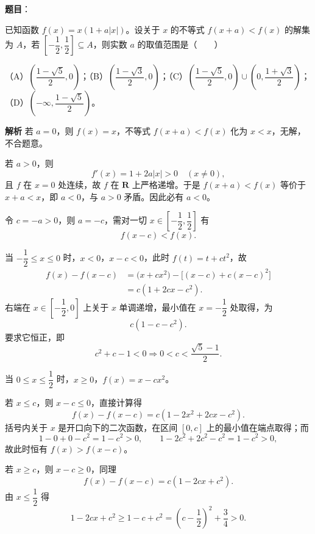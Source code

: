 \begin{answer}

\textbf{题目}：

已知函数 $f(x)=x(1+a|x|)$。设关于 $x$ 的不等式 $f(x+a)<f(x)$ 的解集为 $A$，若 $\left[-\dfrac12,\dfrac12\right]\subseteq A$，则实数 $a$ 的取值范围是\mbox{（　　）}

（A）$\left(\dfrac{1-\sqrt5}{2},0\right)$；（B）$\left(\dfrac{1-\sqrt3}{2},0\right)$；（C）$\left(\dfrac{1-\sqrt5}{2},0\right)\cup\left(0,\dfrac{1+\sqrt3}{2}\right)$；（D）$\left(-\infty,\dfrac{1-\sqrt5}{2}\right)$。

\textbf{解析}
若 $a=0$，则 $f(x)=x$，不等式 $f(x+a)<f(x)$ 化为 $x<x$，无解，不合题意。

若 $a>0$，则
\nopagebreak[4]
\[f'(x)=1+2a|x|>0\quad(x\neq0),\]
且 $f$ 在 $x=0$ 处连续，故 $f$ 在 $\mathbf R$ 上严格递增。于是 $f(x+a)<f(x)$ 等价于 $x+a<x$，即 $a<0$，与 $a>0$ 矛盾。因此必有 $a<0$。

令 $c=-a>0$，则 $a=-c$，需对一切 $x\in\left[-\dfrac12,\dfrac12\right]$ 有
\nopagebreak[4]
\[f(x-c)<f(x).\]

当 $-\dfrac12\leqslant x\leqslant0$ 时，$x<0$，$x-c<0$，此时 $f(t)=t+ct^2$，故
\nopagebreak[4]
\[\begin{aligned}
f(x)-f(x-c)
&=\bigl(x+cx^2\bigr)-\bigl[(x-c)+c(x-c)^2\bigr]\\
&=c(1+2cx-c^2).
\end{aligned}\]
右端在 $x\in\left[-\dfrac12,0\right]$ 上关于 $x$ 单调递增，最小值在 $x=-\dfrac12$ 处取得，为
\nopagebreak[4]
\[c(1-c-c^2).\]
要求它恒正，即
\nopagebreak[4]
\[c^2+c-1<0\Longrightarrow 0<c<\frac{\sqrt5-1}{2}.\]

当 $0\leqslant x\leqslant\dfrac12$ 时，$x\geqslant0$，$f(x)=x-cx^2$。

若 $x\leqslant c$，则 $x-c\leqslant0$，直接计算得
\nopagebreak[4]
\[f(x)-f(x-c)=c(1-2x^2+2cx-c^2).\]
括号内关于 $x$ 是开口向下的二次函数，在区间 $[0,c]$ 上的最小值在端点取得；而
\nopagebreak[4]
\[1-0+0-c^2=1-c^2>0,\qquad
1-2c^2+2c^2-c^2=1-c^2>0,\]
故此时恒有 $f(x)>f(x-c)$。

若 $x\geqslant c$，则 $x-c\geqslant0$，同理
\nopagebreak[4]
\[f(x)-f(x-c)=c(1-2cx+c^2).\]
由 $x\leqslant\dfrac12$ 得
\nopagebreak[4]
\[1-2cx+c^2\geqslant 1-c+c^2=\left(c-\frac12\right)^2+\frac34>0.\]


\end{answer}
